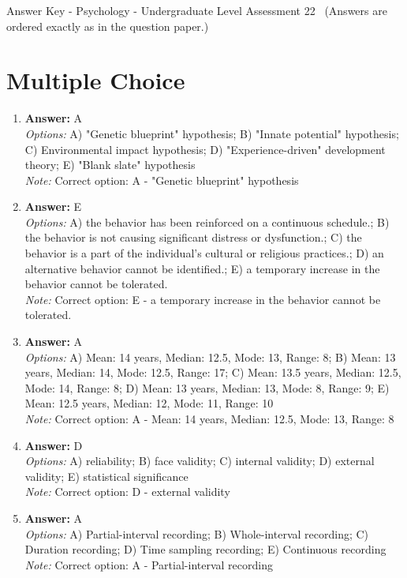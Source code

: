 \documentclass[12pt]{article}
\begin{document}
\begin{center}
Answer Key - Psychology - Undergraduate Level Assessment 22 \
\small (Answers are ordered exactly as in the question paper.)
\end{center}

\section*{Multiple Choice}
\begin{enumerate}[label=\arabic*.]
\item \textbf{Answer:} A
\\ \textit{Options:} A) "Genetic blueprint" hypothesis; B) "Innate potential" hypothesis; C) Environmental impact hypothesis; D) "Experience-driven" development theory; E) "Blank slate" hypothesis
\\ \textit{Note:} Correct option: A - "Genetic blueprint" hypothesis
\item \textbf{Answer:} E
\\ \textit{Options:} A) the behavior has been reinforced on a continuous schedule.; B) the behavior is not causing significant distress or dysfunction.; C) the behavior is a part of the individual's cultural or religious practices.; D) an alternative behavior cannot be identified.; E) a temporary increase in the behavior cannot be tolerated.
\\ \textit{Note:} Correct option: E - a temporary increase in the behavior cannot be tolerated.
\item \textbf{Answer:} A
\\ \textit{Options:} A) Mean: 14 years, Median: 12.5, Mode: 13, Range: 8; B) Mean: 13 years, Median: 14, Mode: 12.5, Range: 17; C) Mean: 13.5 years, Median: 12.5, Mode: 14, Range: 8; D) Mean: 13 years, Median: 13, Mode: 8, Range: 9; E) Mean: 12.5 years, Median: 12, Mode: 11, Range: 10
\\ \textit{Note:} Correct option: A - Mean: 14 years, Median: 12.5, Mode: 13, Range: 8
\item \textbf{Answer:} D
\\ \textit{Options:} A) reliability; B) face validity; C) internal validity; D) external validity; E) statistical significance
\\ \textit{Note:} Correct option: D - external validity
\item \textbf{Answer:} A
\\ \textit{Options:} A) Partial-interval recording; B) Whole-interval recording; C) Duration recording; D) Time sampling recording; E) Continuous recording
\\ \textit{Note:} Correct option: A - Partial-interval recording
\end{enumerate}
\end{document}
